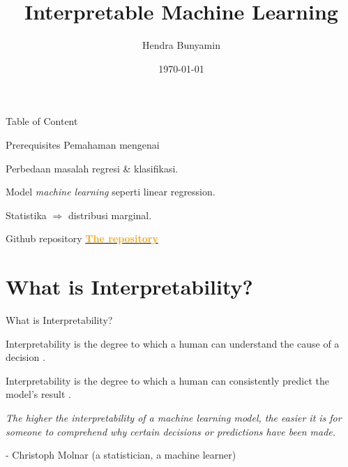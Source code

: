 \documentclass[aspectratio=169]{beamer}
\title[Interpretability]{Interpretable Machine Learning}
\author{Hendra Bunyamin}
\institute{Maranatha Christian University}
\date{\today}
\begin{document}
\maketitle


\begin{frame}{Table of Content}
    \tableofcontents
\end{frame}

\begin{frame}{Prerequisites}
	Pemahaman mengenai
	\begin{vfilleditems}
		\item Perbedaan masalah regresi \& klasifikasi.
		\item Model \textit{machine learning} seperti linear regression.
		\item Statistika $\Rightarrow$ distribusi marginal.
	\end{vfilleditems}
\end{frame}

\begin{frame}{Github repository}
	\href{https://github.com/hbunyamin/2021-nuni-it-online-seminar}{\textcolor{orange}{\textbf{The repository}} }
\end{frame}

\section{What is Interpretability?}
\begin{frame}{What is Interpretability? }
    \begin{vfilleditems}
	\item Interpretability is the degree to which a human can understand the cause of a decision  \citep{miller2019explanation}.
	\item Interpretability is the degree to which a human can consistently predict the model's result \citep{kim2016examples}.
	\end{vfilleditems}
\end{frame}

\begin{frame}
	\centering
	\textit{The higher the interpretability of a machine learning model, the easier it is for someone to comprehend why certain decisions or predictions have been made.}
	
	\bigskip
	- Christoph Molnar (a statistician, a machine learner)
\end{frame}
\end{document}

